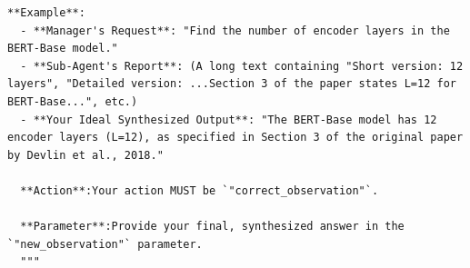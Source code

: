\begin{tcolorbox}[
        colback=gray!5!white,
        colframe=gray!50!black,
        title=Prompt for "result\_synthesis",
        floatplacement=Hp,
        breakable  %
    ]
\begin{lstlisting}[basicstyle=\ttfamily\small, breaklines=true, columns=fixed, breakindent=0pt, xleftmargin=0pt, gobble=0]
  **Example**:
  - **Manager's Request**: "Find the number of encoder layers in the BERT-Base model."
  - **Sub-Agent's Report**: (A long text containing "Short version: 12 layers", "Detailed version: ...Section 3 of the paper states L=12 for BERT-Base...", etc.)
  - **Your Ideal Synthesized Output**: "The BERT-Base model has 12 encoder layers (L=12), as specified in Section 3 of the original paper by Devlin et al., 2018."
  
  **Action**:Your action MUST be `"correct_observation"`.
  
  **Parameter**:Provide your final, synthesized answer in the `"new_observation"` parameter.
  """
  \end{lstlisting}
\end{tcolorbox}
